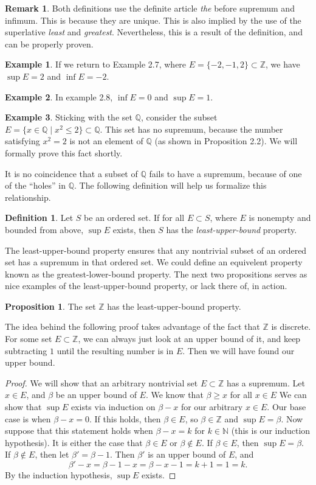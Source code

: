 \documentclass{article}
\newcommand{\N}{\mathbb{N}}
\newcommand{\Q}{\mathbb{Q}}
\newcommand{\Z}{\mathbb{Z}}
\theoremstyle{definition}
\newtheorem{proposition}{Proposition}[section]
\newtheorem{definition}{Definition}[section]
\newtheorem{example}{Example}[section]
\newtheorem{remark}{Remark}[section]
\begin{document}
\begin{remark}
	Both definitions use the definite article \textit{the} before supremum and infimum. This is because they are unique. This is also implied by the use of the superlative \textit{least} and \textit{greatest}. Nevertheless, this is a result of the definition, and can be properly proven. 
\end{remark}

\begin{example}
	If we return to Example 2.7, where $ E=\{-2,-1,2\}\subset\Z $, we have $ \sup E=2 $ and $ \inf E=-2 $. 
\end{example}
\begin{example}
	In example 2.8, $ \inf E=0 $ and $ \sup E=1 $.
\end{example}
\begin{example}
	Sticking with the set $ \Q$, consider the subset $ E=\{x\in\Q\mid x^2\le 2\}\subset \Q $. This set has no supremum, because the number satisfying $ x^2=2 $ is not an element of $ \Q $ (as shown in Proposition 2.2). We will formally prove this fact shortly. 
\end{example}
It is no coincidence that a subset of $ \Q $ fails to have a supremum, because of one of the ``holes'' in $ \Q $. The following definition will help us formalize this relationship. 
\begin{definition}
	Let $ S $ be an ordered set. If for all $ E\subset S $, where $ E $ is nonempty and bounded from above, $ \sup E $ exists, then $ S $ has the \textit{\color{red}least-upper-bound} property. 
\end{definition}
The least-upper-bound property ensures that any nontrivial subset of an ordered set has a supremum in that ordered set. We could define an equivelent property known as the greatest-lower-bound property. The next two propositions serves as nice examples of the least-upper-bound property, or lack there of,  in action.
\begin{proposition}
	The set $ \Z $ has the least-upper-bound property.
\end{proposition}
The idea behind the following proof takes advantage of the fact that $ \Z $ is discrete. For some set $ E\subset \Z $, we can always just look at an upper bound of it, and keep subtracting $ 1 $ until the resulting number is in $ E $. Then we will have found our upper bound.
\begin{proof}
	We will show that an arbitrary nontrivial set $ E\subset \Z $ has a supremum. Let $ x\in E $, and $ \beta $ be an upper bound of $ E $. We know that $ \beta\ge x $ for all $ x\in E $ We can show that $ \sup E $ exists via induction on $ \beta-x $ for our arbitrary $ x\in E $. Our base case is when $ \beta-x=0 $. If this holds, then $ \beta\in E $, so $ \beta\in\Z $ and $ \sup E=\beta $. Now suppose that this statement holds when $ \beta-x=k $ for $ k\in\N $ (this is our induction hypothesis). It is either the case that $ \beta\in E $ or $ \beta\notin E $. If $ \beta\in E $, then $ \sup E=\beta $. If $ \beta \notin E $, then let $ \beta'=\beta -1 $. Then $ \beta' $ is an upper bound of $ E $, and $$\beta'-x=\beta-1-x=\beta-x-1=k+1=1=k .$$ By the induction hypothesis, $ \sup E $ exists.   
\end{proof}
\end{document}
